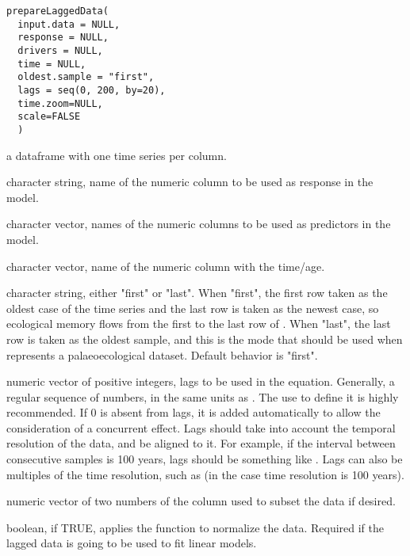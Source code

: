 \documentclass[letterpaper]{book}
\begin{document}
%
\begin{Usage}
\begin{verbatim}
prepareLaggedData(
  input.data = NULL,
  response = NULL,
  drivers = NULL,
  time = NULL,
  oldest.sample = "first",
  lags = seq(0, 200, by=20),
  time.zoom=NULL,
  scale=FALSE
  )
\end{verbatim}
\end{Usage}
%
\begin{Arguments}
\begin{ldescription}
\item[\code{input.data}] a dataframe with one time series per column.

\item[\code{response}] character string, name of the numeric column to be used as response in the model.

\item[\code{drivers}] character vector, names of the numeric columns to be used as predictors in the model.

\item[\code{time}] character vector, name of the numeric column with the time/age.

\item[\code{oldest.sample}] character string, either "first" or "last". When "first", the first row taken as the oldest case of the time series and the last row is taken as the newest case, so ecological memory flows from the first to the last row of . When "last", the last row is taken as the oldest sample, and this is the mode that should be used when  represents a palaeoecological dataset. Default behavior is "first".

\item[\code{lags}] numeric vector of positive integers, lags to be used in the equation. Generally, a regular sequence of numbers, in the same units as . The use  to define it is highly recommended. If 0 is absent from lags, it is added automatically to allow the consideration of a concurrent effect. Lags should take into account the temporal resolution of the data, and be aligned to it. For example, if the interval between consecutive samples is 100 years, lags should be something like . Lags can also be multiples of the time resolution, such as  (in the case time resolution is 100 years).

\item[\code{time.zoom}] numeric vector of two numbers of the  column used to subset the data if desired.

\item[\code{scale}] boolean, if TRUE, applies the  function to normalize the data. Required if the lagged data is going to be used to fit linear models.
\end{ldescription}
\end{Arguments}
\end{document}
